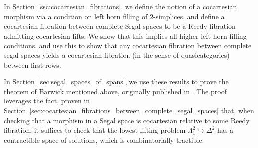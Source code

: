 \documentclass[main.tex]{subfiles}
\begin{document}
In \hyperref[ssc:cocartesian_fibrations]{Section~\ref*{ssc:cocartesian_fibrations}}, we define the notion of a cocartesian morphism via a condition on left horn filling of $2$-simplices, and define a cocartesian fibration between complete Segal spaces to be a Reedy fibration admitting cocartesian lifts. We show that this implies all higher left horn filling conditions, and use this to show that any cocartesian fibration between complete segal spaces yields a cocartesian fibration (in the sense of quasicategories) between first rows.

In \hyperref[sec:segal_spaces_of_spans]{Section~\ref*{sec:segal_spaces_of_spans}}, we use these results to prove the theorem of Barwick mentioned above, originally published in \cite[Thm.~12.2]{spectralmackeyfunctors1}. The proof leverages the fact, proven in \hyperref[sec:cocartesian_fibrations_between_complete_segal_spaces]{Section~\ref*{sec:cocartesian_fibrations_between_complete_segal_spaces}} that, when checking that a morphism in a Segal space is cocartesian relative to some Reedy fibration, it suffices to check that the lowest lifting problem $\Lambda^{2}_{1} \hookrightarrow \Delta^{2}$ has a contractible space of solutions, which is combinatorially tractible.

%
\end{document}
